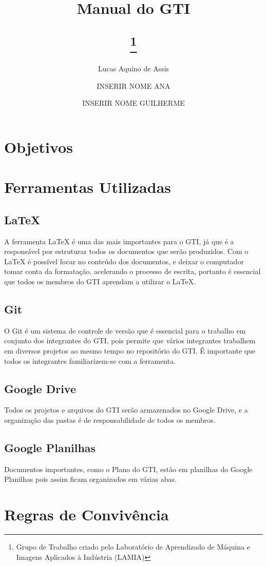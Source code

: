 \documentclass{article}
\title{Manual do GTI
	\author{
		Lucas Aquino de Assis
		\and
		INSERIR NOME ANA
		\and
		INSERIR NOME GUILHERME
	}
	\thanks{Grupo de Trabalho criado pelo Laboratório de Aprendizado de Máquina e Imagens Aplicados à Indústria (LAMIA)}
}
\begin{document}
\begin{titlepage}
\maketitle
\end{titlepage}

\tableofcontents

\section{Objetivos}

\section{Ferramentas Utilizadas}
\subsection{LaTeX}
A ferramenta LaTeX é uma das mais importantes para o GTI, já que é a responsável por estruturar todos os documentos que serão produzidos. Com o LaTeX é possível focar no conteúdo dos documentos, e deixar o computador tomar conta da formatação, acelerando o processo de escrita, portanto é essencial que todos os membros do GTI aprendam a utilizar o LaTeX.

\subsection{Git}
O Git é um sistema de controle de versão que é essencial para o trabalho em conjunto dos integrantes do GTI, pois permite que vários integrantes trabalhem em diversos projetos ao mesmo tempo no repositório do GTI. É importante que todos os integrantes familiarizem-se com a ferramenta.

\subsection{Google Drive}
Todos os projetos e arquivos do GTI serão armazenados no Google Drive, e a organização das pastas é de responsabilidade de todos os membros.

\subsection{Google Planilhas}
Documentos importantes, como o Plano do GTI, estão em planilhas do Google Planilhas pois assim ficam organizados em várias abas.

\section{Regras de Convivência}
\end{document}
